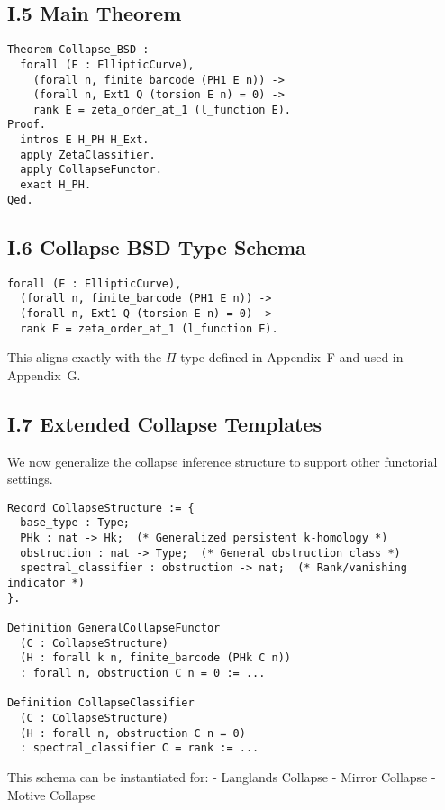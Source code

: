 \documentclass[11pt]{article}
\begin{document}
\subsection*{I.5 Main Theorem}

\begin{lstlisting}
Theorem Collapse_BSD :
  forall (E : EllipticCurve),
    (forall n, finite_barcode (PH1 E n)) ->
    (forall n, Ext1 Q (torsion E n) = 0) ->
    rank E = zeta_order_at_1 (l_function E).
Proof.
  intros E H_PH H_Ext.
  apply ZetaClassifier.
  apply CollapseFunctor.
  exact H_PH.
Qed.
\end{lstlisting}

\subsection*{I.6 Collapse BSD Type Schema}

\begin{lstlisting}
forall (E : EllipticCurve),
  (forall n, finite_barcode (PH1 E n)) ->
  (forall n, Ext1 Q (torsion E n) = 0) ->
  rank E = zeta_order_at_1 (l_function E).
\end{lstlisting}

This aligns exactly with the $\Pi$-type defined in Appendix~F and used in Appendix~G.

\subsection*{I.7 Extended Collapse Templates}

We now generalize the collapse inference structure to support other functorial settings.

\begin{lstlisting}
Record CollapseStructure := {
  base_type : Type;
  PHk : nat -> Hk;  (* Generalized persistent k-homology *)
  obstruction : nat -> Type;  (* General obstruction class *)
  spectral_classifier : obstruction -> nat;  (* Rank/vanishing indicator *)
}.

Definition GeneralCollapseFunctor
  (C : CollapseStructure)
  (H : forall k n, finite_barcode (PHk C n))
  : forall n, obstruction C n = 0 := ...

Definition CollapseClassifier
  (C : CollapseStructure)
  (H : forall n, obstruction C n = 0)
  : spectral_classifier C = rank := ...
\end{lstlisting}

This schema can be instantiated for:
- Langlands Collapse
- Mirror Collapse
- Motive Collapse
\end{document}
